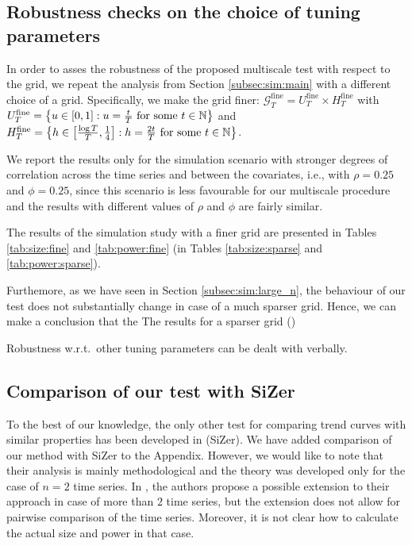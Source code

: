 \documentclass[12pt]{article}
\begin{document}
{\color{red}
\subsection{Robustness checks on the choice of tuning parameters}\label{subsec:sim:grid}

In order to asses the robustness of the proposed multiscale test with respect to the grid, we repeat the analysis from Section \ref{subsec:sim:main} with a different choice of a grid. Specifically, we make the grid finer: $\mathcal{G}_T^{\text{fine}} = U_T^{\text{fine}} \times H_T^{\text{fine}}$ with 
$U_T^{\text{fine}}  = \big\{ u \in [0,1]: u = \textstyle{\frac{t}{T}} \text{ for some } t \in \mathbb{N} \big\}$
and
$H_T^{\text{fine}} = \big\{ h \in \big[ \textstyle{\frac{\log T}{T}}, \textstyle{\frac{1}{4}} \big]:  h = \textstyle{\frac{2t}{T}} \text{ for some } t \in \mathbb{N} \big\}$.

We report the results only for the simulation scenario with stronger degrees of correlation across the time series and between the covariates, i.e., with $\rho = 0.25$ and $\phi = 0.25$, since this scenario is less favourable for our multiscale procedure and the results with different values of $\rho$ and $\phi$ are fairly similar.

The results of the simulation study with a finer grid are presented in Tables \ref{tab:size:fine} and \ref{tab:power:fine} (in Tables \ref{tab:size:sparse} and \ref{tab:power:sparse}).

Furthemore, as we have seen in Section \ref{subsec:sim:large_n}, the behaviour of our test does not substantially change in case of a much sparser grid. Hence, we can make a conclusion that the  The results for a sparser grid ()

Robustness w.r.t.\ other tuning parameters can be dealt with verbally.  


\subsection{Comparison of our test with SiZer} 


 To the best of our knowledge, the only other test for comparing trend curves with similar properties has been developed in \cite{Park2009} (SiZer). We have added comparison of our method with SiZer to the Appendix. However, we would like to note that their analysis is mainly methodological and the theory was developed only for the case of $n=2$ time series. In \cite{Park2009}, the authors propose a possible extension to their approach in case of more than $2$ time series, but the extension does not allow for pairwise comparison of the time series. Moreover, it is not clear how to calculate the actual size and power in that case.

}
\end{document}

